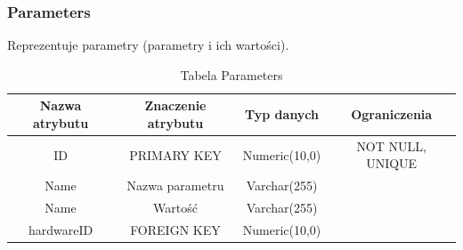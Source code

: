 \subsubsection{Parameters}
Reprezentuje parametry (parametry i ich wartości).
\begin{table}[H]
	\renewcommand\arraystretch{1.5}
	\renewcommand\tabcolsep{3pt}
	\begin{tabular}{| c | c | c | c |} 
		\hline \textbf{Nazwa atrybutu} & \textbf{Znaczenie atrybutu} & \textbf{Typ danych} & \textbf{Ograniczenia} \\ 
		\hline ID & PRIMARY KEY & Numeric(10,0) & NOT NULL, UNIQUE \\ 
		\hline Name & Nazwa parametru & Varchar(255) &  \\ 
		\hline Name & Wartość & Varchar(255) &  \\
		\hline hardwareID & FOREIGN KEY & Numeric(10,0) & \\ 
		\hline 
	\end{tabular} 
	\caption{Tabela Parameters}
	\label{TAB:Parameters}
\end{table}